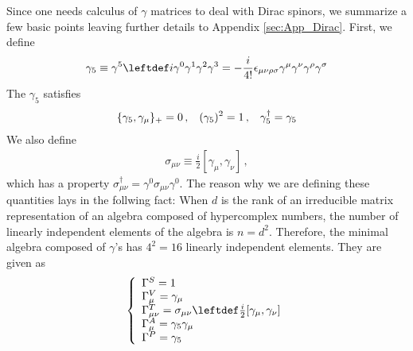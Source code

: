 Since one needs calculus of $\gamma$ matrices to deal with Dirac spinors,
we summarize a few basic points leaving further details to Appendix \ref{sec:App_Dirac}.
First, we define
\begin{eqnarray}
\gamma_5 \equiv \gamma^5 \leftdef
i \gamma^0 \gamma^1 \gamma^2 \gamma^3
=
- \frac{i}{4!}
\epsilon_{\mu \nu \rho \sigma}
\gamma^\mu \gamma^\nu \gamma^\rho \gamma^\sigma
\end{eqnarray}
The $\gamma_5$ satisfies
\begin{eqnarray}
\{
\gamma_5, \gamma_\mu 
\}_+ = 0\,,
\hspace{3mm}
(\gamma_5)^2 = 1\,,
\hspace{3mm}
\gamma_5^\dagger = \gamma_5
\end{eqnarray}
We also define
\begin{eqnarray}
\sigma_{\mu \nu} \equiv
\frac{i}{2}
[ \gamma_\mu, \gamma_\nu]\,,
\end{eqnarray}
which has a property $\sigma_{\mu \nu}^\dagger = \gamma^0 \sigma_{\mu \nu} \gamma^0$.
The reason why we are defining these quantities lays in the follwing fact:
When $d$ is the rank of an irreducible matrix representation of an algebra composed of hypercomplex numbers,
the number of linearly independent elements of the algebra is $n = d^2$. Therefore, the minimal algebra composed
of $\gamma$'s has $4^2 = 16$ linearly independent elements. They are given as
\begin{eqnarray}
\left\{
\begin{array}{l}
\Gamma^S
=
1
\\
\Gamma^V_\mu
=
\gamma_\mu
\\
\Gamma^T_{\mu \nu}
=
\sigma_{\mu \nu} \leftdef
\frac{i}{2}
[ \gamma_\mu, \gamma_\nu]
\\
\Gamma^A_{\mu}
=
\gamma_5 \gamma_\mu
\\
\Gamma^P
=
\gamma_5
\end{array}
\right.
\end{eqnarray}

